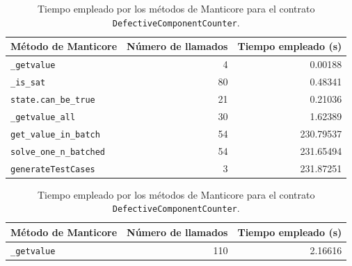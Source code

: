 
\begin{table}[ht]
    \begin{minipage}{0.95\textwidth}
        \centering
        \begin{tabular}[t]{l @{\hskip 30pt} r @{\hskip 30pt} r}
            \toprule
            \textbf{Método de Manticore}                      & \textbf{Número de llamados} & \textbf{Tiempo empleado (s)} \\
            \midrule
            \rowcolor{color1} \texttt{\_getvalue}             & 4                           & 0.00188                      \\
            \rowcolor{color1} \texttt{\_is\_sat}              & 80                          & 0.48341                      \\
            \rowcolor{color2} \texttt{state.can\_be\_true}    & 21                          & 0.21036                      \\
            \rowcolor{color1} \texttt{\_getvalue\_all}        & 30                          & 1.62389                      \\
            \rowcolor{color2} \texttt{get\_value\_in\_batch}  & 54                          & 230.79537                    \\
            \rowcolor{color2} \texttt{solve\_one\_n\_batched} & 54                          & 231.65494                    \\
            \rowcolor{color3} \texttt{generateTestCases}      & 3                           & 231.87251                    \\
            \bottomrule
        \end{tabular}
        \caption{Tiempo empleado por los métodos de Manticore para el contrato \texttt{DefectiveComponentCounter}.}
        \label{tab:performance-DefectiveComponentCounter}
    \end{minipage}
    \begin{minipage}{0.95\textwidth}
        \centering
        \begin{tabular}[t]{l @{\hskip 30pt} r @{\hskip 30pt} r}
            \toprule
            \textbf{Método de Manticore}                      & \textbf{Número de llamados} & \textbf{Tiempo empleado (s)} \\
            \midrule
            \rowcolor{color1} \texttt{\_getvalue}             & 110                         & 2.16616                      \\

\end{tabular}
\end{minipage}
\end{table}
